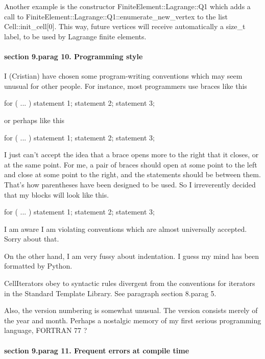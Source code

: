 Another example is the constructor {\codett FiniteElement::Lagrange::Q1}
which adds a call to {\codett FiniteElement::Lagrange::Q1::enumerate\_new\_vertex} to
the list {\codett Cell::init\_cell[0]}.
This way, future vertices will receive automatically a {\codett size\_t} label, to be used
by Lagrange finite elements.


\paragraph{\numb section 9.\numb parag 10. Programming style}

I (Cristian) have chosen some program-writing conventions which may seem unusual for other people.
For instance, most programmers use braces like this

\verbatim
   for ( ... ) {
      statement 1;
      statement 2;
      statement 3;
   }
\endverbatim

or perhaps like this

\verbatim
   for ( ... )
   {
      statement 1;
      statement 2;
      statement 3;
   }
\endverbatim

I just can't accept the idea that a brace opens more to the right that it closes, or at the
same point.
For me, a pair of braces should open at some point to the left and close at some point to the
right, and the statements should be between them.
That's how parentheses have been designed to be used.
So I irreverently decided that my blocks will look like this.

\verbatim
   for ( ... )
   {  statement 1;
      statement 2;
      statement 3;  }
\endverbatim

I am aware I am violating conventions which are almost universally accepted. Sorry about that.

On the other hand, I am very fussy about indentation.
I guess my mind has been formatted by Python.

{\codett CellIterator}s obey to syntactic rules divergent from the conventions for iterators
in the Standard Template Library.
See paragraph \numb section 8.\numb parag 5.

Also, the version numbering is somewhat unusual.
The version consists merely of the year and month.
Perhaps a nostalgic memory of my first serious programming language, FORTRAN 77 ?


\paragraph{\numb section 9.\numb parag 11. Frequent errors at compile time}

